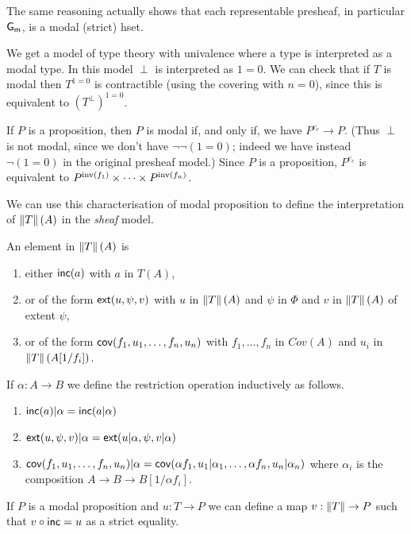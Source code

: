 The same reasoning actually shows that each representable presheaf, in particular $\mathsf{G_m}$, is a modal
(strict) hset.

\medskip

We get a model of type theory with univalence where a type is interpreted as a modal type.
In this model $\perp$ is interpreted as $1=0$. We can check that if $T$ is modal then
$T^{1=0}$ is contractible (using the covering with $n=0$), since this is equivalent to $(T^{\perp})^{1=0}$.

\medskip

If $P$ is a proposition, then $P$ is modal if, and only if,
we have $P^{e_c}\rightarrow P$.
(Thus $\perp$ is not modal, since we don't have $\neg\neg(1=0)$; indeed we have instead $\neg(1=0)$ in
the original presheaf model.)
Since $P$ is a
proposition, $P^{e_c}$ is equivalent to $P^{\mathrm{inv}(f_1)}\times \dots\times P^{\mathrm{inv}(f_n)}$.

\medskip

We can use this characterisation of modal proposition to define the interpretation of
$\left\lVert T \right\rVert(A)$ in the {\em sheaf} model.

An element in $\left\lVert T \right\rVert(A)$ is
\begin{enumerate}
\item either $\mathsf{inc}(a)$ with $a$ in $T(A)$,
\item or of the form $\mathsf{ext}(u,\psi,v)$ with $u$ in $\left\lVert T \right\rVert(A)$ and $\psi$ in $\Phi$ and
  $v$ in $\left\lVert T \right\rVert(A)$ of extent $\psi$,
\item or of the form $\mathsf{cov}(f_1,u_1,\dots,f_n,u_n)$ with $f_1,\dots,f_n$ in $Cov(A)$ and $u_i$ in $\left\lVert T \right\rVert(A[1/f_i])$.
\end{enumerate}

If $\alpha:A\rightarrow B$ we define the restriction operation inductively as follows.
\begin{enumerate}
\item $\mathsf{inc}(a)|\alpha = \mathsf{inc}(a|\alpha)$
\item $\mathsf{ext}(u,\psi,v)|\alpha = \mathsf{ext}(u|\alpha,\psi,v|\alpha)$
\item $\mathsf{cov}(f_1,u_1,\dots,f_n,u_n)|\alpha = \mathsf{cov}(\alpha f_1,u_1|\alpha_1,\dots,\alpha f_n,u_n|\alpha_n)$ where
  $\alpha_i$ is the composition $A\rightarrow B\rightarrow B[1/\alpha f_i]$.
\end{enumerate}

If $P$ is a modal proposition and $u:T\rightarrow P$ we can define a map $v:\left\lVert T \right\rVert\rightarrow P$
such that $v\circ\mathsf{inc} = u$ as a strict equality.


